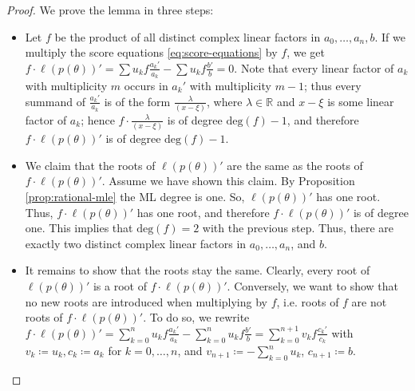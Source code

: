 \begin{proof}
    We prove the lemma in three steps:
    \begin{itemize}
        \item Let \( f \) be the product of all distinct complex linear factors in \( a_0, \dots, a_n, b \).  If we multiply the score equations \eqref{eq:score-equations} by \( f \), we get \( f \cdot \ell(p(\theta))' = \sum u_k f \frac{a_k'}{a_k} - \sum u_k f \frac{b'}{b} = 0 \).
        Note that every linear factor of \( a_k \) with multiplicity \( m \) occurs in \( a_k' \) with multiplicity \( m-1 \); thus every summand of \( \frac{a_k'}{a_k} \) is of the form \( \frac{\lambda}{(x-\xi)} \), where \( \lambda \in \mathbb{R} \) and \( x-\xi \) is some linear factor of \( a_k \); hence \( f \cdot  \frac{\lambda}{(x-\xi)}  \) is of degree \( \mathrm{deg}(f) - 1\), and therefore \( f \cdot \ell(p(\theta))' \) is of degree \( \mathrm{deg}(f) - 1\).

        \item We claim that the roots of \( \ell(p(\theta))' \) are the same as the roots of \( f \cdot \ell(p(\theta))' \). Assume we have shown this claim.  By Proposition \ref{prop:rational-mle} the ML degree is one. So, \( \ell(p(\theta))' \) has one root. Thus, \( f \cdot \ell(p(\theta))' \) has one root, and therefore \( f \cdot \ell(p(\theta))' \) is of degree one. This implies that \( \mathrm{deg}(f) = 2 \) with the previous step. Thus, there are exactly two distinct complex linear factors in \( a_0, \dots, a_n \), and \( b \).
        
        \item It remains to show that the roots stay the same. Clearly, every root of \( \ell(p(\theta))' \) is a root of \( f \cdot \ell(p(\theta))' \). Conversely, we want to show that no new roots are introduced when multiplying by \( f \), i.e. roots of \( f \) are not roots of \(  f \cdot \ell(p(\theta))' \). To do so, we rewrite \( f \cdot \ell(p(\theta))' = \sum_{k=0}^n u_k f \frac{a_k'}{a_k} - \sum_{k=0}^n u_k f \frac{b'}{b} = \sum_{k=0}^{n + 1} v_k f \frac{c_k'}{c_k} \)
        with \( v_k \coloneqq u_k, c_k \coloneqq a_k  \) for \( k=0, \dots,n \), and \(  v_{n+1} \coloneqq - \sum_{k=0}^n u_k \), \( c_{n+1} \coloneqq b \).


\end{itemize}
\end{proof}
